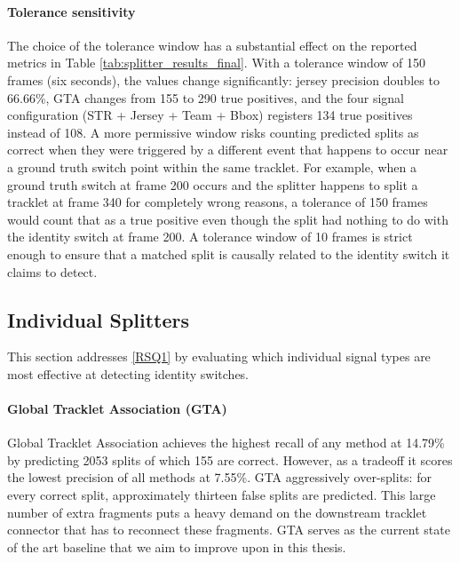 \paragraph{Tolerance sensitivity}
The choice of the tolerance window has a substantial effect on the reported metrics in Table \ref{tab:splitter_results_final}. With a tolerance window of 150 frames (six seconds), the values change significantly: jersey precision doubles to 66.66\%, GTA changes from 155 to 290 true positives, and the four signal configuration (STR + Jersey + Team + Bbox) registers 134 true positives instead of 108. A more permissive window risks counting predicted splits as correct when they were triggered by a different event that happens to occur near a ground truth switch point within the same tracklet. For example, when a ground truth switch at frame 200 occurs and the splitter happens to split a tracklet at frame 340 for completely wrong reasons, a tolerance of 150 frames would count that as a true positive even though the split had nothing to do with the identity switch at frame 200. A tolerance window of 10 frames is strict enough to ensure that a matched split is causally related to the identity switch it claims to detect.



\subsection{Individual Splitters}\label{subsec:individual_splitters}
This section addresses \ref{RSQ1} by evaluating which individual signal types are most effective at detecting identity switches.
\

\paragraph{Global Tracklet Association (GTA)}
Global Tracklet Association achieves the highest recall of any method at 14.79\% by predicting 2053 splits of which 155 are correct. However, as a tradeoff it scores the lowest precision of all methods at 7.55\%. GTA aggressively over-splits: for every correct split, approximately thirteen false splits are predicted. This large number of extra fragments puts a heavy demand on the downstream tracklet connector that has to reconnect these fragments. GTA serves as the current state of the art baseline that we aim to improve upon in this thesis.


